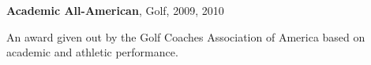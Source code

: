 \documentclass[letterpaper,10pt]{article}
\newlength{\outerbordwidth}
\newcommand{\resheading}[1]{\vspace{8pt}
  \parbox{\textwidth}{\setlength{\FrameSep}{\outerbordwidth}
    \begin{shaded}
\setlength{\fboxsep}{0pt}\framebox[\textwidth][l]{\setlength{\fboxsep}{4pt}\fcolorbox{shadecolorB}{shadecolorB}{\textbf{\sffamily{\mbox{~}\makebox[6.762in][l]{\large #1} \vphantom{p\^{E}}}}}}
    \end{shaded}
  }\vspace{-5pt}
}
\begin{document}
\begin{comment}
\end{center}
\begin{center}
	\parbox{6.5in}{\textbf{Intercollegiate Academics Fund Travel Award}, UNI, Fall 2012}
	\parbox{6.5in}{Award allocated to promote and support the presentation of research at an academic conference.}
	\parbox{6.5in}{Amount: \$650}
\end{center}
\begin{center}
	\parbox{6.5in}{\textbf{Graduate Student Opportunity Fund For Travel}, UNI, Fall 2012}
	\parbox{6.5in}{Award to support travel for graduate students presenting at an academic conference.}
	\parbox{6.5in}{Amount: \$250}
\end{center}
\begin{center}
	\parbox{6.5in}{\textbf{College of Social and Behavioral Sciences Graduate Research Award}, UNI, Fall 2012}
	\parbox{6.5in}{Award allocated for the purchase of expenses related to thesis research.}
	\parbox{6.5in}{Amount: \$500}
\end{center}
\begin{center}
	\parbox{6.5in}{\textbf{Graduate College Tuition Scholarship}, UNI,  Fall 2012}
	\parbox{6.5in}{Scholarship based on academic performance.}
\end{center}
\end{comment}
\begin{center}
	\parbox{6.5in}{\textbf{Academic All-American}, Golf, 2009, 2010}
	\parbox{6.5in}{An award given out by the Golf Coaches Association of America based on academic and athletic performance.}
\end{center}


%
\end{document}

